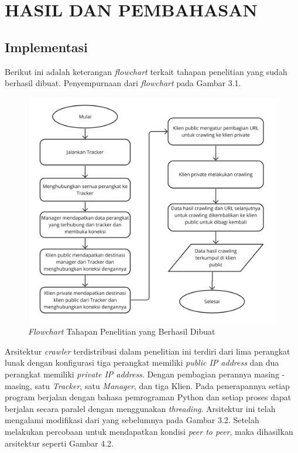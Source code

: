 
\chapter{HASIL DAN PEMBAHASAN}

\section{Implementasi}
Berikut ini adalah keterangan \emph{flowchart} terkait tahapan penelitian yang sudah berhasil dibuat. Penyempurnaan dari \emph{flowchart} pada Gambar 3.1.

\begin{figure}[H]
  \centering{}
	\includegraphics[width=1\textwidth]{gambar/flowchart_crawler_terdistribusi}
  \caption{\emph{Flowchart} Tahapan Penelitian yang Berhasil Dibuat}
\end{figure}

Arsitektur \emph{crawler} terdistribusi dalam penelitian ini terdiri dari lima perangkat lunak dengan konfigurasi tiga perangkat memiliki \emph{public IP address} dan dua perangkat memiliki \emph{private IP address}. Dengan pembagian perannya masing - masing, satu \emph{Tracker}, satu \emph{Manager}, dan tiga Klien. Pada penerapannya setiap program berjalan dengan bahasa pemrograman Python dan setiap proses dapat berjalan secara paralel dengan menggunakan \emph{threading}. Arsitektur ini telah mengalami modifikasi dari yang sebelumnya pada Gambar 3.2. Setelah melakukan percobaan untuk mendapatkan kondisi \emph{peer to peer}, maka dihasilkan arsitektur seperti Gambar 4.2.

